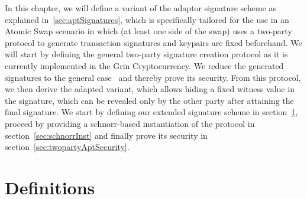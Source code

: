 In this chapter, we will define a variant of the adaptor signature scheme as explained in~\ref{sec:aptSignatures},
which is specifically tailored for the use in an Atomic Swap scenario in which (at least one side of the swap) uses a two-party protocol to generate transaction signatures and keypairs are fixed beforehand.
We will start by defining the general two-party signature creation protocol as it is currently implemented in the Grin Cryptocurrency.
We reduce the generated signatures to the general case~\cite{schnorr1989efficient} and thereby prove its security.
From this protocol, we then derive the adapted variant, which allows hiding a fixed witness
value in the signature, which can be revealed only by the other party after attaining the final signature.
We start by defining our extended signature scheme in section~\ref{sec:definitions}, proceed by providing a schnorr-based instantiation of the protocol in section~\ref{sec:schnorrInst} and finally prove its security in section~\ref{sec:twopartyAptSecurity}.

\section{Definitions}\label{sec:definitions}

